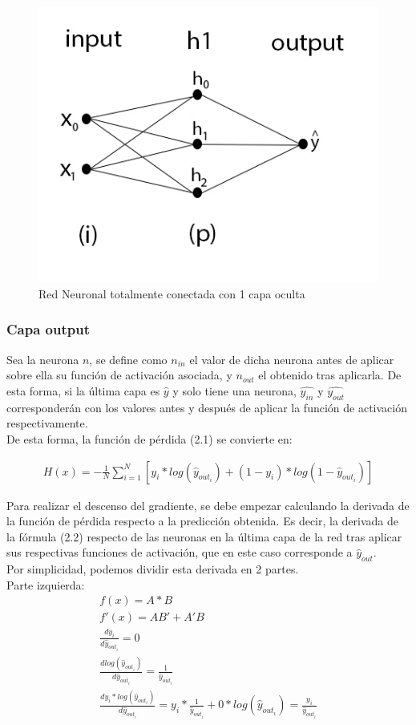 \begin{figure}[H]
	\centering
	\includegraphics[scale=0.35]{imagenes/nn_1_capa.jpg}  
	\caption{Red Neuronal totalmente conectada con 1 capa oculta}
	\label{fig:nn_1_capa}
\end{figure}


\subsubsection{Capa output}

Sea la neurona $n$, se define como $n_{in}$ el valor de dicha neurona antes de aplicar sobre ella su función de activación asociada, y $n_{out}$ el obtenido tras aplicarla.
De esta forma, si la última capa es $\hat{y}$ y solo tiene una neurona, $\hat{y_{in}}$ y $\hat{y_{out}}$ corresponderán con los valores antes y después de aplicar la función de activación respectivamente.\\

De esta forma, la función de pérdida (2.1) se convierte en:

\begin{gather}
    H(x) = - \frac{1}{N} \sum_{i=1}^{N}  [y_i * log( \hat{y}_{out_i}) + (1-y_i)*log(1-\hat{y}_{out_i})]
\end{gather}

Para realizar el descenso del gradiente, se debe empezar calculando la derivada de la función de pérdida respecto a la predicción obtenida. Es decir, la derivada de la fórmula (2.2) respecto de las neuronas en la última capa de la red tras aplicar sus respectivas funciones de activación, que en este caso corresponde a $\hat{y}_{out}$. \\
Por simplicidad, podemos dividir esta derivada en 2 partes. \\
Parte izquierda:
\begin{gather}
	f(x) = A*B \\  
	f'(x) = AB' + A'B \\
	\frac{dy_i}{d\hat{y}_{out_i}} = 0 \\
	\frac{dlog(\hat{y}_{out_i} )}{d\hat{y}_{out_i}} = \frac{1}{\hat{y}_{out_i}} \\
	\frac{dy_i * log( \hat{y}_{out_i})}{d\hat{y}_{out_i}} = y_i*\frac{1}{\hat{y}_{out_i}} + 0*log(\hat{y}_{out_i} ) = \frac{y_i}{\hat{y}_{out_i}}
\end{gather}

